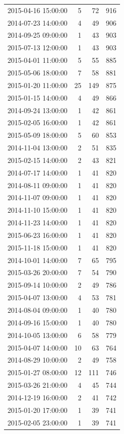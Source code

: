 \begin{tabular}{lrrr}
2015-04-16 15:00:00 & 5 & 72 & 916 \\
2014-07-23 14:00:00 & 4 & 49 & 906 \\
2014-09-25 09:00:00 & 1 & 43 & 903 \\
2015-07-13 12:00:00 & 1 & 43 & 903 \\
2015-04-01 11:00:00 & 5 & 55 & 885 \\
2015-05-06 18:00:00 & 7 & 58 & 881 \\
2015-01-20 11:00:00 & 25 & 149 & 875 \\
2015-01-15 14:00:00 & 4 & 49 & 866 \\
2014-09-24 13:00:00 & 1 & 42 & 861 \\
2015-02-05 16:00:00 & 1 & 42 & 861 \\
2015-05-09 18:00:00 & 5 & 60 & 853 \\
2014-11-04 13:00:00 & 2 & 51 & 835 \\
2015-02-15 14:00:00 & 2 & 43 & 821 \\
2014-07-17 14:00:00 & 1 & 41 & 820 \\
2014-08-11 09:00:00 & 1 & 41 & 820 \\
2014-11-07 09:00:00 & 1 & 41 & 820 \\
2014-11-10 15:00:00 & 1 & 41 & 820 \\
2014-11-23 14:00:00 & 1 & 41 & 820 \\
2015-06-23 16:00:00 & 1 & 41 & 820 \\
2015-11-18 15:00:00 & 1 & 41 & 820 \\
2014-10-01 14:00:00 & 7 & 65 & 795 \\
2015-03-26 20:00:00 & 7 & 54 & 790 \\
2015-09-14 10:00:00 & 2 & 49 & 786 \\
2015-04-07 13:00:00 & 4 & 53 & 781 \\
2014-08-04 09:00:00 & 1 & 40 & 780 \\
2014-09-16 15:00:00 & 1 & 40 & 780 \\
2014-10-05 13:00:00 & 6 & 58 & 779 \\
2015-04-07 14:00:00 & 10 & 63 & 764 \\
2014-08-29 10:00:00 & 2 & 49 & 758 \\
2015-01-27 08:00:00 & 12 & 111 & 746 \\
2015-03-26 21:00:00 & 4 & 45 & 744 \\
2014-12-19 16:00:00 & 2 & 41 & 742 \\
2015-01-20 17:00:00 & 1 & 39 & 741 \\
2015-02-05 23:00:00 & 1 & 39 & 741 \\

\end{tabular}
